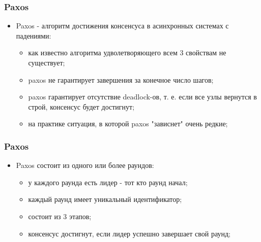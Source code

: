 \begin{frame}
\frametitle{Paxos}
\begin{itemize}
  \item Paxos - алгоритм достижения консенсуса в асинхронных системах с падениями:
    \begin{itemize}
      \item как известно алгоритма удволетворяющего всем 3 свойствам не существует;
      \item paxos не гарантирует завершения за конечное число шагов;
      \item paxos гарантирует отсутствие deadlock-ов, т. е. если все узлы вернутся в строй, консенсус будет достигнут;
      \item на практике ситуация, в которой paxos "зависнет" очень редкие;
    \end{itemize}
\end{itemize}
\end{frame}

\begin{frame}
\frametitle{Paxos}
\begin{itemize}
  \item Paxos состоит из одного или более раундов:
    \begin{itemize}
      \item у каждого раунда есть лидер - тот кто раунд начал;
      \item каждый раунд имеет уникальный идентификатор;
      \item состоит из 3 этапов;
      \item консенсус достигнут, если лидер успешно завершает свой раунд;
    \end{itemize}
\end{itemize}
\end{frame}

